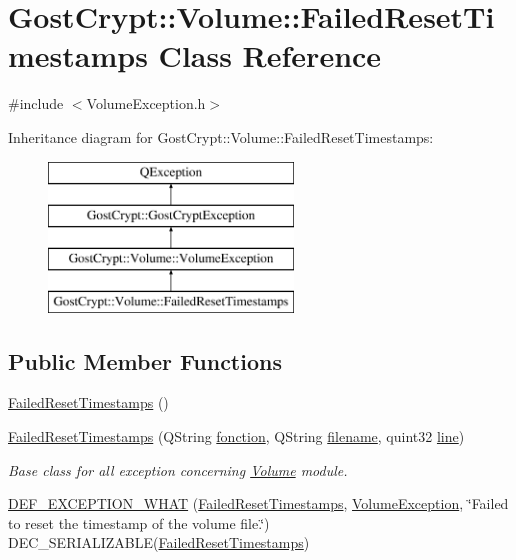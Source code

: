 \hypertarget{class_gost_crypt_1_1_volume_1_1_failed_reset_timestamps}{}\section{Gost\+Crypt\+:\+:Volume\+:\+:Failed\+Reset\+Timestamps Class Reference}
\label{class_gost_crypt_1_1_volume_1_1_failed_reset_timestamps}


{\ttfamily \#include $<$Volume\+Exception.\+h$>$}

Inheritance diagram for Gost\+Crypt\+:\+:Volume\+:\+:Failed\+Reset\+Timestamps\+:\begin{figure}[H]
\begin{center}
\leavevmode
\includegraphics[height=4.000000cm]{class_gost_crypt_1_1_volume_1_1_failed_reset_timestamps}
\end{center}
\end{figure}
\subsection*{Public Member Functions}
\begin{DoxyCompactItemize}
\item 
\hyperlink{class_gost_crypt_1_1_volume_1_1_failed_reset_timestamps_a22b97dc432e2f5ba37185e2992a77a58}{Failed\+Reset\+Timestamps} ()
\item 
\hyperlink{class_gost_crypt_1_1_volume_1_1_failed_reset_timestamps_aeed895c80b186bafe9d0706ad678bbfc}{Failed\+Reset\+Timestamps} (Q\+String \hyperlink{class_gost_crypt_1_1_gost_crypt_exception_a29b8c93d5efbb1ff369107385725a939}{fonction}, Q\+String \hyperlink{class_gost_crypt_1_1_gost_crypt_exception_a749a12375f4ba9d502623b99d8252f38}{filename}, quint32 \hyperlink{class_gost_crypt_1_1_gost_crypt_exception_abf506d911f12a4e969eea500f90bd32c}{line})
\begin{DoxyCompactList}\small\item\em Base class for all exception concerning \hyperlink{class_gost_crypt_1_1_volume_1_1_volume}{Volume} module. \end{DoxyCompactList}\item 
\hyperlink{class_gost_crypt_1_1_volume_1_1_failed_reset_timestamps_a007a5624dfd122fc6a5498a62f0a48cf}{D\+E\+F\+\_\+\+E\+X\+C\+E\+P\+T\+I\+O\+N\+\_\+\+W\+H\+AT} (\hyperlink{class_gost_crypt_1_1_volume_1_1_failed_reset_timestamps}{Failed\+Reset\+Timestamps}, \hyperlink{class_gost_crypt_1_1_volume_1_1_volume_exception}{Volume\+Exception}, \char`\"{}Failed to reset the timestamp of the volume file.\char`\"{}) D\+E\+C\+\_\+\+S\+E\+R\+I\+A\+L\+I\+Z\+A\+B\+LE(\hyperlink{class_gost_crypt_1_1_volume_1_1_failed_reset_timestamps}{Failed\+Reset\+Timestamps})
\end{DoxyCompactItemize}
